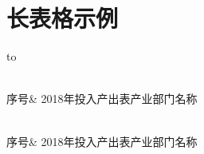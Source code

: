 
\chapter{长表格示例}

\begin{small}
\begin{longtabu} to \textwidth {X[-1cp]X[1cp]} 
    \caption{产业部门划分表}\\
    \toprule
    序号& 
    2018年投入产出表产业部门名称\\
    \midrule
    \endfirsthead

    \\
    \toprule
    序号& 
    2018年投入产出表产业部门名称\\
    \midrule    
    \endhead
    
    \bottomrule
    \\
    \endfoot
    
    \bottomrule
    \endlastfoot


\end{longtabu}
\end{small}
